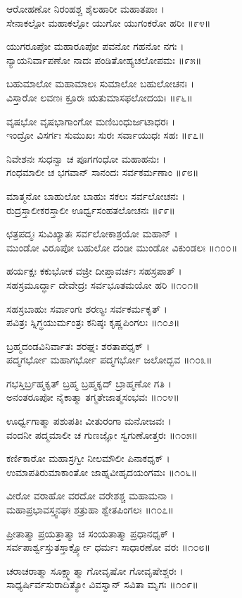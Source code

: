 ಆರೋಹಣೋ ನಿರಂಹಶ್ಚ ಶೈಲಹಾರೀ ಮಹಾತಪಾಃ ।\\
ಸೇನಾಕಲ್ಪೋ ಮಹಾಕಲ್ಪೋ ಯುಗೋ ಯುಗಂಕರೋ ಹರಿಃ ॥೯೪॥

ಯುಗರೂಪೋ ಮಹಾರೂಪೋ ಪವನೋ ಗಹನೋ ನಗಃ ।\\
ನ್ಯಾಯನಿರ್ವಾಪಣೋ ನಾದಃ ಪಂಡಿತೋಹ್ಯಚಲೋಪಮಃ ॥೯೫॥

ಬಹುಮಾಲೋ ಮಹಾಮಾಲಃ ಸುಮಾಲೋ ಬಹುಲೋಚನಃ ।\\
ವಿಸ್ತಾರೋ ಲವಣಃ ಕ್ರೂರಃ ಋತುಮಾಸಫಲೋದಯಃ ॥೯೬॥

ವೃಷಭೋ ವೃಷಭಾಗಾಂಗೋ ಮಣಿಬಂಧುರ್ಜಟಾಧರಃ ।\\
ಇಂದ್ರೋ ವಿಸರ್ಗಃ ಸುಮುಖಃ ಸುರಃ ಸರ್ವಾಯುಧಃ ಸಹಃ ॥೯೭॥

ನಿವೇಶನಃ ಸುಧನ್ವಾ ಚ ಪೂಗಗಂಧೋ ಮಹಾಹನುಃ ।\\
ಗಂಧಮಾಲೀ ಚ ಭಗವಾನ್ ಸಾನಂದಃ ಸರ್ವಕರ್ಮಣಾಂ ॥೯೮॥

ಮಾತ್ಮನೋ ಬಾಹುಲೋ ಬಾಹುಃ ಸಕಲಃ ಸರ್ವಲೋಚನಃ ।\\
ರುದ್ರಸ್ತಾಲೀಕರಸ್ತಾಲೀ ಊರ್ಧ್ವಸಂಹತಲೋಚನಃ ॥೯೯॥

ಛತ್ರಪದ್ಮಃ ಸುವಿಖ್ಯಾತಃ ಸರ್ವಲೋಕಾಶ್ರಯೋ ಮಹಾನ್ ।\\
ಮುಂಡೋ ವಿರೂಪೋ ಬಹುಲೋ ದಂಡೀ ಮುಂಡೋ ವಿಕುಂಡಲಃ ॥೧೦೦॥

ಹರ್ಯಕ್ಷಃ ಕಕುಭೋಕ ವಜ್ರೀ ದೀಪ್ತಾವರ್ಚಃ ಸಹಸ್ರಪಾತ್ ।\\
ಸಹಸ್ರಮೂರ್ದ್ಧಾ ದೇವೇದ್ರಃ ಸರ್ವಭೂತಮಯೋ ಹರಿ ॥೧೦೧॥

ಸಹಸ್ರಬಾಹುಃ ಸರ್ವಾಂಗಃ ಶರಣ್ಯಃ ಸರ್ವಕರ್ಮಕೃತ್ ।\\
ಪವಿತ್ರಃ ಸ್ನಿಗ್ಧಯುರ್ಮಂತ್ರಃ ಕನಿಷ್ಠಃ ಕೃಷ್ಣಪಿಂಗಲಃ ॥೧೦೨॥

ಬ್ರಹ್ಮದಂಡವಿನಿರ್ವಾತಃ ಶರಘ್ನಃ ಶರತಾಪಧೃಕ್ ।\\
ಪದ್ಮಗರ್ಭೋ ಮಹಾಗರ್ಭೋ ಪದ್ಮಗರ್ಭೋ ಜಲೋದ್ಭವ ॥೧೦೩॥

ಗಭಸ್ತಿರ್ಬ್ರಹ್ಮಕೃತ್ ಬ್ರಹ್ಮ ಬ್ರಹ್ಮಕೃದ್ ಬ್ರಾಹ್ಮಣೋ ಗತಿ ।\\
ಅನಂತರೂಪೋ ನೈಕಾತ್ಮಾ ತಗ್ಮತೇಜಾತ್ಮಸಂಭವಃ ॥೧೦೪॥

ಊರ್ಧ್ವಗಾತ್ಮಾ ಪಶುಪತಿಃ ವೀತುರಂಗಾ ಮನೋಜವಃ ।\\
ವಂದನೀ ಪದ್ಮಮಾಲೀ ಚ ಗುಣಜ್ಞೋ ಸ್ವಗುಣೋತ್ತರಃ ॥೧೦೫॥

ಕರ್ಣಿಕಾರೋ ಮಹಾಸ್ರಗ್ವೀ ನೀಲಮೌಲೀ ಪಿನಾಕಧೃಕ್ ।\\
ಉಮಾಪತಿರುಮಾಕಾಂತೋ ಜಾಹ್ನವೀಹೃದಯಂಗಮಃ ॥೧೦೬॥

ವೀರೋ ವರಾಹೋ ವರದೋ ವರೇಶಶ್ಚ ಮಹಾಮನಾ ।\\
ಮಹಾಪ್ರಭಾವಸ್ತ್ವನಘಃ ಶತ್ರುಹಾ ಶ್ವೇತಪಿಂಗಲಃ ॥೧೦೭॥

ಪ್ರೀತಾತ್ಮಾ ಪ್ರಯತ್ತಾತ್ಮಾ ಚ ಸಂಯತಾತ್ಮಾ ಪ್ರಧಾನಧೃಕ್ ।\\
ಸರ್ವಪಾರ್ಶ್ವಸ್ತುತಸ್ತಾರ್ಕ್ಷ್ಯೋ ಧರ್ಮಃ ಸಾಧಾರಣೋ ವರಃ ॥೧೦೮॥

ಚರಾಚರಾತ್ಮಾ ಸೂಕ್ಷ್ಮಾತ್ಮಾ ಗೋವೃಷೋ ಗೋವೃಷೇಶ್ಚರಃ ।\\
ಸಾಧ್ಯರ್ಷಿರ್ವಸುರಾದಿತ್ಯೋ ವಿವಸ್ವಾನ್ ಸವಿತಾ ಮೃಗಃ ॥೧೦೯॥

